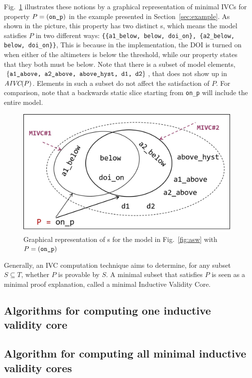 Fig.~\ref{fig:ivcs} illustrates these notions by a graphical representation of minimal IVCs for property $P = ({\small{\texttt{on\_p}}})$ in the example presented in Section~\ref{sec:example}. As shown in the picture, this property has two distinct \mivc s, which means the model satisfies $P$ in two different ways:  {\small \texttt{\{\{a1\_below, below, doi\_on\}, \{a2\_below, below, doi\_on\}\}}}, This is because in the implementation, the DOI is turned on when either of the altimeters is below the threshold, while our property states that they both must be below.
Note that there is a subset of model elements, $\{{\small \texttt{a1\_above, a2\_above, above\_hyst, d1, d2}}\}$, that does not show up in $\textit{AIVC}(P)$. Elements in such a subset
do not affect the satisfaction of $P$.  For comparison, note that a backwards static slice starting from {\small{\texttt{on\_p}}} will include the entire model.

\begin{figure}[t]
 \centering
  \includegraphics[width=0.9\columnwidth]{figs/ivcs.png}
  \vspace{-0.1in}
  \caption{Graphical representation of \mivc s for the model in Fig.~\ref{fig:asw}
  with  $P = ({\small \texttt{on\_p}})$}
  \label{fig:ivcs}
\end{figure}


Generally, an IVC computation technique aims to determine, for any subset $S \subseteq T$, whether $P$ is provable by $S$.  A minimal subset that satisfies $P$ is seen as a minimal proof explanation, called a minimal Inductive Validity Core.


\subsection{Algorithms for computing one inductive validity core}




\subsection{Algorithm for computing all minimal inductive validity cores}
\label{sec:allivcs}

